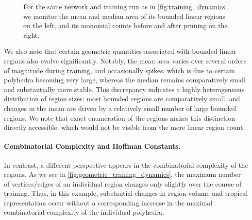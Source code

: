 \documentclass[10pt]{article}
\theoremstyle{definition}
\theoremstyle{remark}
\begin{document}
\begin{figure}[H]
    \hfill
    \begin{minipage}[t]{0.44\textwidth}
        \centering
    \end{minipage}
    \caption{
    For the same network and training run as in \cref{fig:training_dynamics}, we monitor the mean and median area of its bounded linear regions on the left, and its monomial counts before and after pruning on the right.
    }
    \label{fig:volume_dynamics}
\end{figure}

We also note that certain geometric quantities associated with bounded linear regions also evolve significantly. Notably, the mean area varies over several orders of magnitude during training, and occasionally spikes, which is due to certain polyhedra becoming very large, whereas the median remains comparatively small and substantially more stable.
This discrepancy indicates a highly heterogeneous distribution of region sizes: most bounded regions are comparatively small, and 
changes in the mean are driven by a relatively small number of large bounded regions.
We note that exact enumeration of the regions makes this distinction directly accessible, which would not be visible from the mere linear region count.

\paragraph{Combinatorial Complexity and Hoffman Constants.} In contrast, a different perspective appears in the combinatorial complexity of the
regions. As we see in \cref{fig:geometric_training_dynamics}, the maximum number of vertices/edges of an individual region changes only slightly over the course of training. Thus, in this example, substantial changes in region volume and tropical representation occur without a corresponding increase in the maximal combinatorial complexity of the individual polyhedra.
\end{document}

